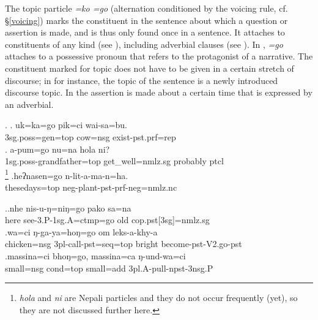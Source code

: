 The topic particle \emph{=ko \ti =go} (alternation conditioned by the voicing rule, cf. §\ref{voicing}) marks the constituent in the sentence about which a question or  assertion is made, and is thus only found once in a sentence. It  attaches to constituents of any kind (see \Next), including adverbial clauses (see \NNext). In \Next[a], \emph{=go} attaches to a possessive pronoun that refers to the protagonist of a narrative. The constituent marked for topic does not have to be given in a certain stretch of discourse; in \Next[b] for instance, the topic of the sentence is a newly introduced discourse topic. In \Next[c] the assertion is made about a certain time that is expressed by an adverbial. 

\ex. \ag. uk=ka=go  pik=ci wai-sa=bu.\\
{\sc 3sg.poss=gen=top} cow{\sc =nsg} exist{\sc -pst.prf=rep}\\
 
\bg. a-pum=go  nu=na hola ni?\\
		{\sc 1sg.poss-}grandfather{\sc =top} get\_well{\sc [3sg]=nmlz.sg} probably {\sc ptcl}\\
		\footnote{\emph{hola} and \emph{ni} are Nepali particles and they do not occur frequently (yet), so they are not discussed further here.} 
		\bg.heʔnasen=go    n-lit-a-ma-n=ha.\\
		thesedays{\sc =top} {\sc neg-}plant{\sc [3sg]-pst-prf-neg=nmlz.nc}\\
		 
		
		\ex.\ag.nhe  nis-u-ŋ=niŋ=go                     pako         sa=na\\
		here see{\sc [pst]-3.P-1sg.A=ctmp=go} old  {\sc cop.pst[3sg]=nmlz.sg}\\
		 
		\bg.wa=ci         ŋ-ga-ya=hoŋ=go                  om     leks-a-khy-a\\
		chicken{\sc =nsg} {\sc 3pl-}call{\sc -pst=seq=top} bright become{\sc [3]-pst-V2.go-pst}\\
		 
		\bg.massina=ci    bhoŋ=go,    massina=ca        ŋ-und-wa=ci\\
		small{\sc =nsg} {\sc cond=top} small{\sc =add} {\sc 3pl.A-}pull{\sc -npst-3nsg.P}\\
		 
				

